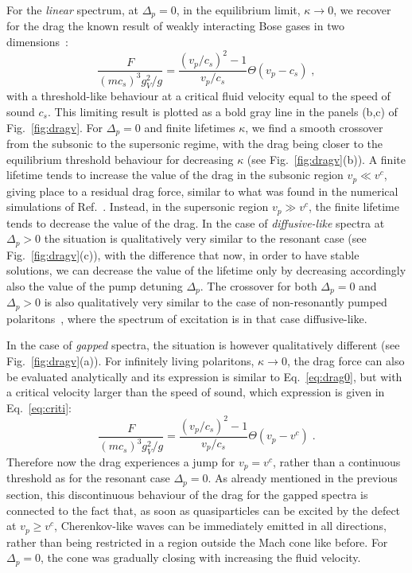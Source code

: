 For the \emph{linear} spectrum, at $\Delta_p=0$, in the equilibrium
limit, $\kappa \to 0$, we recover for the drag the known result of
weakly interacting Bose gases in two
dimensions~\cite{Astrakharchik_2004}:
%
\begin{equation}
  \frac{F}{(mc_s)^3 g_V^2/g}=\frac{(v_p/c_s)^2 - 1}{v_p/c_s}
  \Theta(v_p - c_s)\; ,
\label{eq:drag0}
\end{equation}
%
with a threshold-like behaviour at a critical fluid velocity equal to
the speed of sound $c_s$. This limiting result is plotted as a bold
gray line in the panels (b,c) of Fig.~\ref{fig:dragv}. For
$\Delta_p=0$ and finite lifetimes $\kappa$, we find a smooth crossover
from the subsonic to the supersonic regime, with the drag being closer
to the equilibrium threshold behaviour for decreasing $\kappa$ (see
Fig.~\ref{fig:dragv}(b)). A finite lifetime tends to increase the
value of the drag in the subsonic region $v_p \ll v^c$, giving place
to a residual drag force, similar to what was found in the numerical
simulations of Ref.~\cite{Cancellieri_2010}. Instead, in the supersonic
region $v_p \gg v^c$, the finite lifetime tends to decrease the value
of the drag. In the case of \emph{diffusive-like} spectra at
$\Delta_p>0$ the situation is qualitatively very similar to the
resonant case (see Fig.~\ref{fig:dragv}(c)), with the difference that
now, in order to have stable solutions, we can decrease the value of
the lifetime only by decreasing accordingly also the value of the pump
detuning $\Delta_p$. The crossover for both $\Delta_p = 0$ and
$\Delta_p > 0$ is also qualitatively very similar to the case of
non-resonantly pumped polaritons~\cite{Wouters_2010}, where the
spectrum of excitation is in that case diffusive-like.

In the case of \emph{gapped} spectra, the situation is however
qualitatively different (see Fig.~\ref{fig:dragv}(a)). For infinitely
living polaritons, $\kappa \to 0$, the drag force can also be
evaluated analytically and its expression is similar to
Eq.~\eqref{eq:drag0}, but with a critical velocity larger than the
speed of sound, which expression is given in Eq.~\eqref{eq:criti}:
%
\begin{equation}
  \frac{F}{(mc_s)^3 g_V^2/g}=\frac{(v_p/c_s)^2 - 1}{v_p/c_s}
  \Theta(v_p - v^c)\; .
\end{equation}
%
Therefore now the drag experiences a jump for $v_p=v^c$, rather than a
continuous threshold as for the resonant case $\Delta_p=0$. As already
mentioned in the previous section, this discontinuous behaviour of the
drag for the gapped spectra is connected to the fact that, as soon as
quasiparticles can be excited by the defect at $v_p\ge v^c$,
Cherenkov-like waves can be immediately emitted in all directions,
rather than being restricted in a region outside the Mach cone like
before. For $\Delta_p=0$, the cone was gradually closing with
increasing the fluid velocity.

